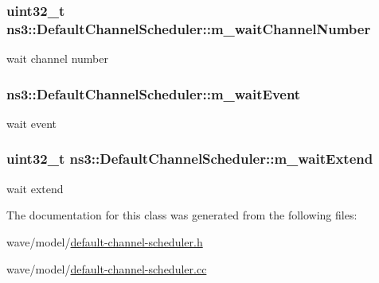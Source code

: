 \subsubsection[{\texorpdfstring{m\+\_\+wait\+Channel\+Number}{m_waitChannelNumber}}]{\setlength{\rightskip}{0pt plus 5cm}uint32\+\_\+t ns3\+::\+Default\+Channel\+Scheduler\+::m\+\_\+wait\+Channel\+Number\hspace{0.3cm}{\ttfamily [private]}}\hypertarget{classns3_1_1DefaultChannelScheduler_ae6bec77b7f234762faeee0370224e259}{}\label{classns3_1_1DefaultChannelScheduler_ae6bec77b7f234762faeee0370224e259}


wait channel number 

\subsubsection[{\texorpdfstring{m\+\_\+wait\+Event}{m_waitEvent}}]{ ns3\+::\+Default\+Channel\+Scheduler\+::m\+\_\+wait\+Event\hspace{0.3cm}{\ttfamily [private]}}\hypertarget{classns3_1_1DefaultChannelScheduler_a82768fbbb4fc84cdffefb0a2b1595ace}{}\label{classns3_1_1DefaultChannelScheduler_a82768fbbb4fc84cdffefb0a2b1595ace}


wait event 

\subsubsection[{\texorpdfstring{m\+\_\+wait\+Extend}{m_waitExtend}}]{\setlength{\rightskip}{0pt plus 5cm}uint32\+\_\+t ns3\+::\+Default\+Channel\+Scheduler\+::m\+\_\+wait\+Extend\hspace{0.3cm}{\ttfamily [private]}}\hypertarget{classns3_1_1DefaultChannelScheduler_ae8e867c65532f6c7e2db6abba1b29d87}{}\label{classns3_1_1DefaultChannelScheduler_ae8e867c65532f6c7e2db6abba1b29d87}


wait extend 



The documentation for this class was generated from the following files\+:\begin{DoxyCompactItemize}
\item 
wave/model/\hyperlink{default-channel-scheduler_8h}{default-\/channel-\/scheduler.\+h}\item 
wave/model/\hyperlink{default-channel-scheduler_8cc}{default-\/channel-\/scheduler.\+cc}\end{DoxyCompactItemize}
